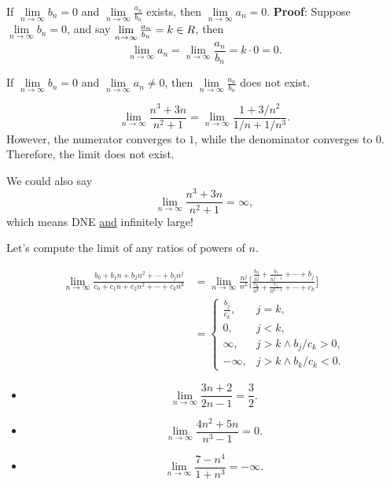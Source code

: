 \begin{Theorem}{}{}
    If $ \lim\limits_{{n} \to {\infty}}b_n=0 $
    and $ \lim\limits_{{n} \to {\infty}}\frac{a_n}{b_n} $
    exists, then $ \lim\limits_{{n} \to {\infty}}a_n=0 $.
    \tcblower{}
    \textbf{Proof}: Suppose $ \lim\limits_{{n} \to {\infty}}b_n=0 $,
    and say $ \lim\limits_{{n} \to {\infty}}\frac{a_n}{b_n}=k\in\relax{R} $,
    then
    \[ \lim\limits_{{n} \to {\infty}}a_n=
        \lim\limits_{{n} \to {\infty}}\frac{a_n}{b_n}=
        k\cdot 0=0. \]
\end{Theorem}
\begin{Corollary}{}{}
    If $ \lim\limits_{{n} \to {\infty}}b_n=0 $
    and $ \lim\limits_{{n} \to {\infty}}a_n\ne 0 $,
    then $ \lim\limits_{{n} \to {\infty}}\frac{a_n}{b_n} $
    does not exist.
\end{Corollary}
\begin{Example}{}{}
    \[ \lim\limits_{{n} \to {\infty}}\frac{n^3+3n}{n^2+1}=
        \lim\limits_{{n} \to {\infty}}\frac{1+3/n^2}{1/n+1/n^3}. \]
    However, the numerator converges to $ 1 $,
    while the denominator converges to $ 0 $.
    Therefore, the limit does not exist.

    We could also say
    \[ \lim\limits_{{n} \to {\infty}}\frac{n^3+3n}{n^2+1}=\infty, \]
    which means DNE \underline{and} infinitely large!
\end{Example}
Let's compute the limit of any ratios of powers of $ n $.
\begin{Proposition}{}{}
    \begin{align*}
        \lim\limits_{{n} \to {\infty}}\frac{b_0+b_1n+b_2n^2+\cdots+b_j n^j}{c_0+c_1n+c_2n^2+\cdots+c_k n^k}
         & =\lim\limits_{{n} \to {\infty}}\frac{n^j}{n^k}
        \biggl[\frac{\frac{b_0}{n^j}+\frac{b_1}{n^{j-1}}+\cdots+b_j}{
                \frac{c_0}{n^k}+\frac{c_1}{n^{k-1}}+\cdots+c_k
        }\biggr]                                          \\
         & =\begin{cases}
                \frac{b_j}{c_k}, & j=k,                \\
                0,               & j<k,                \\
                \infty,          & j>k\land b_j/c_k>0, \\
                -\infty,         & j>k\land b_k/c_k<0.
            \end{cases}
    \end{align*}
\end{Proposition}
\begin{Example}{}{}
    \begin{itemize}
        \item \[ \lim\limits_{{n} \to {\infty}}\frac{3n+2}{2n-1}=\frac{3}{2}. \]
        \item \[ \lim\limits_{{n} \to {\infty}}\frac{4n^2+5n}{n^3-1}=0. \]
        \item \[ \lim\limits_{{n} \to {\infty}}\frac{7-n^4}{1+n^3}=-\infty. \]
    \end{itemize}
\end{Example}
